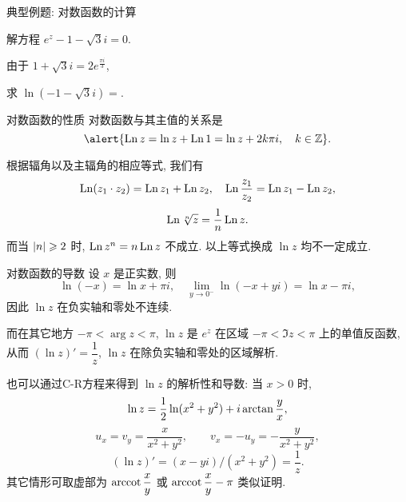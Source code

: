 \begin{frame}{典型例题: 对数函数的计算}
	\onslide<+->
	\begin{example}
		解方程 $e^z-1-\sqrt 3i=0$.
	\end{example}

	\onslide<+->
	\begin{solution}
		由于 $1+\sqrt 3 i=2e^{\frac{\pi i}3}$,
		\onslide<+->{因此
		\[z=\Ln(1+\sqrt 3i)=\ln 2+\left(2k+\frac13\right)\pi i,\quad k\in\BZ.\]}
		\vspace{-\baselineskip}
	\end{solution}

	\onslide<+->
	\begin{exercise}
		求 $\ln(-1-\sqrt3 i)=$.
	\end{exercise}
\end{frame}


\begin{frame}{对数函数的性质}
	\onslide<+->
	对数函数与其主值的关系是
	\[\alert{\Ln z=\ln z+\Ln 1=\ln z+2k\pi i,\quad k\in\BZ}.\]

	\onslide<+->
	根据辐角以及主辐角的相应等式, 我们有
	\[\operatorname{Ln}(z_1\cdot z_2)=\operatorname{Ln} z_1+\operatorname{Ln} z_2,\quad
	\operatorname{Ln}\frac{z_1}{z_2}=\operatorname{Ln} z_1-\operatorname{Ln} z_2,\]
	\[\operatorname{Ln} \sqrt[n]z=\dfrac1n\operatorname{Ln} z.\]
	\onslide<+->
	而当 $\left|n\right|\geqslant 2$ 时, \alert{$\operatorname{Ln} z^n=n\operatorname{Ln} z$ 不成立}.
	\onslide<+->
	以上等式换成 $\ln z$ 均不一定成立.
\end{frame}


\begin{frame}{对数函数的导数}
	\onslide<+->
	设 $x$ 是正实数, 
	\onslide<+->
	则
	\[\ln (-x)=\ln x+\pi i,\quad
	\lim_{y\to0^-}\ln (-x+yi)=\ln x-\pi i,\]
	\onslide<+->
	因此 $\ln z$ 在负实轴和零处不连续.

	\onslide<+->
	而在其它地方 $-\pi<\arg z<\pi$, $\ln z$ 是 $e^z$ 在区域 $-\pi<\Im z<\pi$ 上的单值反函数, 
	\onslide<+->
	从而
	\alert{$(\ln z)'=\dfrac 1z$},
	\alert{$\ln z$ 在除负实轴和零处的区域解析}.

	\onslide<+->
	也可以通过C-R方程来得到 $\ln z$ 的解析性和导数: 当 $x>0$ 时,
	\[\ln z=\frac{1}{2} \ln(x^2+y^2)+i\arctan \frac yx,\]
	\onslide<+->
	\[u_x=v_y=\frac x{x^2+y^2},\qquad v_x=-u_y=-\frac y{x^2+y^2},\]
	\[(\ln z)'=(x-yi)/(x^2+y^2)=\frac 1z.\]
	其它情形可取虚部为 $\operatorname{arccot}\dfrac xy$ 或 $\operatorname{arccot}\dfrac xy-\pi$ 类似证明.
\end{frame}


